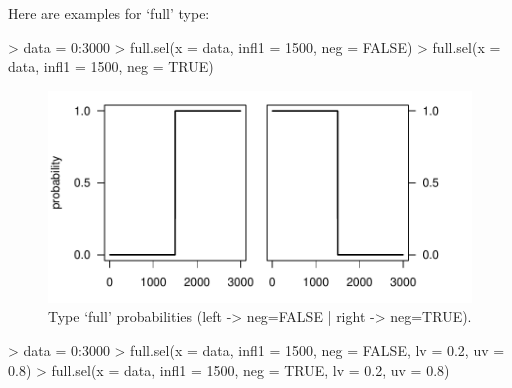 \documentclass[letterpaper, 12pt]{article}
\begin{document}

\newpage

Here are examples for `full' type:
\begin{Schunk}
\begin{Sinput}
> data = 0:3000
> full.sel(x = data, infl1 = 1500, neg = FALSE)
> full.sel(x = data, infl1 = 1500, neg = TRUE)
\end{Sinput}
\end{Schunk}

\begin{figure}[h]
\vspace{-20pt}
\begin{center}
\includegraphics{relation_sel-005}
\end{center}
\vspace{-30pt}
\caption{Type `full' probabilities (left -> neg=FALSE |  right -> neg=TRUE).}
\vspace{-10pt}
\label{fig2}
\end{figure}

\begin{Schunk}
\begin{Sinput}
> data = 0:3000
> full.sel(x = data, infl1 = 1500, neg = FALSE, lv = 0.2, uv = 0.8)
> full.sel(x = data, infl1 = 1500, neg = TRUE, lv = 0.2, uv = 0.8)
\end{Sinput}
\end{Schunk}
\end{document}
